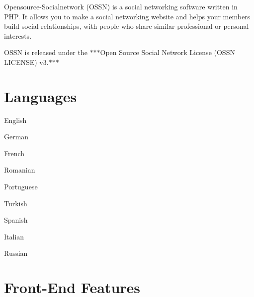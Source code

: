 \href{https://www.opensource-socialnetwork.org/}{\tt } \href{https://www.opensource-socialnetwork.org/}{\tt } \href{https://travis-ci.org/opensource-socialnetwork/opensource-socialnetwork}{\tt }

Opensource-\/\+Socialnetwork (O\+S\+SN) is a social networking software written in P\+HP. It allows you to make a social networking website and helps your members build social relationships, with people who share similar professional or personal interests.

O\+S\+SN is released under the $\ast$$\ast$$\ast$\+Open Source Social Network License (O\+S\+SN L\+I\+C\+E\+N\+SE) v3.$\ast$$\ast$$\ast$

\section*{Languages }


\begin{DoxyItemize}
\item English
\item German
\item French
\item Romanian
\item Portuguese
\item Turkish
\item Spanish
\item Italian
\item Russian
\end{DoxyItemize}

\section*{Front-\/\+End Features }


